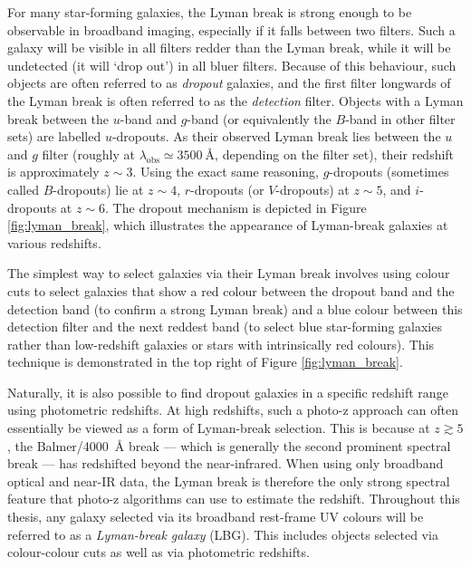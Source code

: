 For many star-forming galaxies, the Lyman break is strong enough to be observable in broadband imaging, especially if it falls between two filters. Such a galaxy will be visible in all filters redder than the Lyman break, while it will be undetected (it will `drop out') in all bluer filters. Because of this behaviour, such objects are often referred to as \textit{dropout} galaxies, and the first filter longwards of the Lyman break is often referred to as the \textit{detection} filter. Objects with a Lyman break between the $u$-band and $g$-band (or equivalently the $B$-band in other filter sets) are labelled $u$-dropouts. As their observed Lyman break lies between the $u$ and $g$ filter (roughly at $\lambda_{\mathrm{obs}}\simeq\SI{3500}{\angstrom}$, depending on the filter set), their redshift is approximately $z\sim3$. Using the exact same reasoning, $g$-dropouts (sometimes called $B$-dropouts) lie at $z\sim4$, $r$-dropouts (or $V$-dropouts) at $z\sim5$, and $i$-dropouts at $z\sim6$. The dropout mechanism is depicted in Figure \ref{fig:lyman_break}, which illustrates the appearance of Lyman-break galaxies at various redshifts. \par  

The simplest way to select galaxies via their Lyman break involves using colour cuts to select galaxies that show a red colour between the dropout band and the detection band (to confirm a strong Lyman break) and a blue colour between this detection filter and the next reddest band (to select blue star-forming galaxies rather than low-redshift galaxies or stars with intrinsically red colours). This technique is demonstrated in the top right of Figure \ref{fig:lyman_break}. \par 
 
Naturally, it is also possible to find dropout galaxies in a specific redshift range using photometric redshifts. At high redshifts, such a photo-z approach can often essentially be viewed as a form of Lyman-break selection. This is because at $z\gtrsim5$, the Balmer/\SI{4000}{\angstrom} break --- which is generally the second prominent spectral break --- has redshifted beyond the near-infrared. When using only broadband optical and near-IR data, the  Lyman break is therefore the only strong spectral feature that photo-z algorithms can use to estimate the redshift. Throughout this thesis, any galaxy selected via its broadband rest-frame UV colours will be referred to as a \textit{Lyman-break galaxy} (LBG). This includes objects selected via colour-colour cuts as well as via photometric redshifts. \par 

